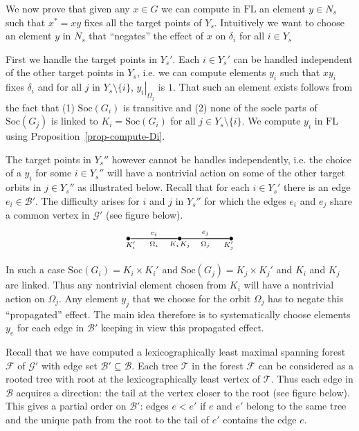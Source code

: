 \documentclass[11pt]{madras}%
\theoremstyle{remark}
\newcommand{\pr}[2]{{\ensuremath{\left.{#1}\right\vert_{#2}}}}
\newcommand{\Soc}[1]{{\ensuremath{\mathrm{Soc}\left(#1\right)}}}
\begin{document}
We now prove that given any $x \in G$ we can compute in $\mathrm{FL}$
an element $y \in N_s$ such that $x^* = xy$ fixes all the target
points of $Y_s$. Intuitively we want to choose an element $y$ in $N_s$
that ``negates'' the effect of $x$ on $\delta_i$ for all $i \in Y_s$

First we handle the target points in $Y_s'$.  Each $i \in Y_s'$ can be
handled independent of the other target points in $Y_s$, i.e. we can
compute elements $y_i$ such that $xy_i$ fixes $\delta_i$ and for all
$j$ in $Y_s \setminus \{ i \}$, $\pr{y_i}{\Omega_j}$ is $1$.  That
such an element exists follows from the fact that (1) $\Soc{G_i}$ is
transitive and (2) none of the socle parts of $\Soc{G_j}$ is linked to
$K_i = \Soc{G_i}$ for all $j \in Y_s \setminus \{ i \}$.  We compute
$y_i$ in $\mathrm{FL}$ using Proposition~\ref{prop-compute-Di}.

The target points in $Y_s''$ however cannot be handles independently,
i.e.  the choice of a $y_i$ for some $i \in Y_s''$ will have a
nontrivial action on some of the other target orbits in $j \in Y_s''$
as illustrated below.  Recall that for each $i \in Y_s'$ there is an
edge $e_i \in \mathcal{B}'$. The difficulty arises for $i$ and $j$ in
$Y_s''$ for which the edges $e_i$ and $e_j$ share a common vertex in
$\mathcal{G}'$ (see figure below).
\[
\xymatrix@M=0pt@W=0pt{ \bullet\ar@{-}[rr]^{e_i}_{\Omega_i}
  \ar@{-}[rr]_<{K_i'} & \ar@{-}[r]_>>{K_i} & \bullet
  \ar@{-}[rr]^{e_j}_{\Omega_j} \ar@{-}[rr]_<<{K_j} & \ar@{-}[r]_>{K_j'}
  & \bullet }
\]

In such a case $\Soc{G_i} = K_i \times K_i'$ and $\Soc{G_j} = K_j
\times K_j'$ and $K_i$ and $K_j$ are linked. Thus any nontrivial
element chosen from $K_i$ will have a nontrivial action on $\Omega_j$.
Any element $y_j$ that we choose for the orbit $\Omega_j$ has to
negate this ``propagated'' effect. The main idea therefore is to
systematically choose elements $y_e$ for each edge in $\mathcal{B}'$
keeping in view this propagated effect.

Recall that we have computed a lexicographically least maximal
spanning forest $\mathcal{F}$ of $\mathcal{G}'$ with edge set
$\mathcal{B}' \subseteq \mathcal{B}$.  Each tree $\mathcal{T}$ in the
forest $\mathcal{F}$ can be considered as a rooted tree with root at
the lexicographically least vertex of $\mathcal{T}$. Thus each edge in
$\mathcal{B}$ acquires a direction: the tail at the vertex closer to
the root (see figure below).  This gives a partial order on
$\mathcal{B}'$: edges $e < e'$ if $e$ and $e'$ belong to the same tree
and the unique path from the root to the tail of $e'$ contains the
edge $e$.
\end{document}
